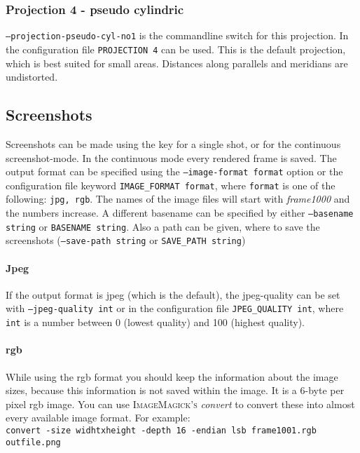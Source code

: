 \subsubsection{Projection 4 - pseudo cylindric}
\texttt{--projection-pseudo-cyl-no1} is the commandline switch for this projection. In the configuration file \texttt{PROJECTION 4} can be used. This is the default projection, which is best suited for small areas. Distances along parallels and meridians are undistorted.



\subsection{Screenshots}
\label{screenshots}
Screenshots can be made using the  key for a single shot, or  for the continuous screenshot-mode. In the continuous mode every rendered frame is saved. The output format can be specified using the \texttt{--image-format format} option or the configuration file keyword \texttt{IMAGE\_FORMAT format}, where \texttt{format} is one of the following: \texttt{jpg, rgb}.
The names of the image files will start with \emph{frame1000} and the numbers increase.
A different basename can be specified by either \texttt{--basename string} or \texttt{BASENAME string}. Also a path can be given, where to save the screenshots (\texttt{--save-path string} or \texttt{SAVE\_PATH string})

\paragraph{Jpeg}
If the output format is jpeg (which is the default), the jpeg-quality can be set with \texttt{--jpeg-quality int} or in the configuration file \texttt{JPEG\_QUALITY int}, where \texttt{int} is a number between 0 (lowest quality) and 100 (highest quality).

\paragraph{rgb}
While using the rgb format you should keep the information about the image sizes, because this information is not saved within the image. It is a 6-byte per pixel rgb image. You can use \textsc{ImageMagick's} \emph{convert} to convert these into almost every available image format. For example:\\
\texttt{convert -size widhtxheight -depth 16 -endian lsb frame1001.rgb outfile.png}



